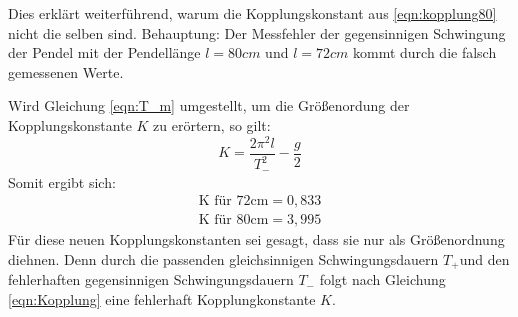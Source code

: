 Dies erklärt weiterführend, warum die Kopplungskonstant aus \ref{eqn:kopplung80} nicht die selben
sind.
Behauptung: Der Messfehler der gegensinnigen Schwingung der Pendel mit der Pendellänge $l=80cm$ und $l=72cm$ kommt durch die falsch gemessenen Werte.

Wird Gleichung \ref{eqn:T_m} umgestellt, um die Größenordung der Kopplungskonstante $K$ zu erörtern, so gilt:
\begin{equation}
    K=\frac{2\pi^2l}{T_{-}^2}-\frac{g}{2}
\end{equation}
Somit ergibt sich:
\begin{align*}
    \textrm{K für 72cm} = 0,833\\
    \textrm{K für 80cm} = 3,995 
\end{align*}
Für diese neuen Kopplungskonstanten sei gesagt, dass sie nur als Größenordnung diehnen.
Denn durch die passenden gleichsinnigen Schwingungsdauern $T_+$und den fehlerhaften gegensinnigen Schwingungsdauern $T_-$
folgt nach Gleichung \ref{eqn:Kopplung} eine fehlerhaft Kopplungkonstante $K$.
 
